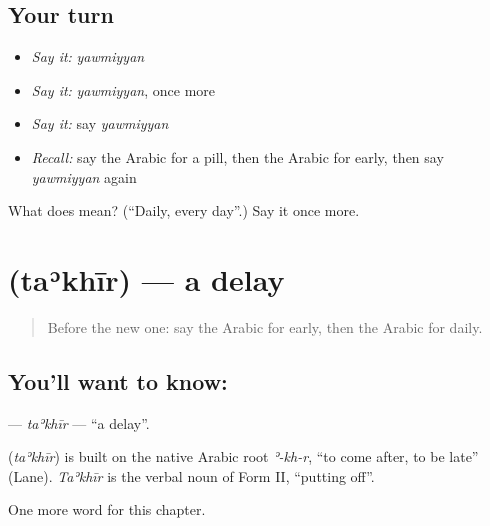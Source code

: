 \subsection*{Your turn}
\begin{itemize}
\raggedright
  \item \emph{Say it:} \emph{yawmiyyan}
  \item \emph{Say it:} \emph{yawmiyyan}, once more
  \item \emph{Say it:} say \emph{yawmiyyan}
  \item \emph{Recall:} say the Arabic for a pill, then the Arabic for early, then say \emph{yawmiyyan} again
\end{itemize}

\begin{tcolorbox}[breakable,colback=teal!4,colframe=teal!35!black,title={Before you move on}]
What does  mean? (\textquotedblleft{}Daily, every day\textquotedblright{}.) Say it once more.
\end{tcolorbox}
\section[\texorpdfstring{\ar{تأخير} (taʾkhīr)}{تأخير (taʾkhīr)}]{ (taʾkhīr) — a delay}

\label{lesson:AR-C170-takhir}



\begin{quote}
Before the new one: say the Arabic for early, then the Arabic for daily.
\end{quote}

\subsection*{You'll want to know: }
\textbf{} — \emph{taʾkhīr} — \textquotedblleft{}a delay\textquotedblright{}.

\begin{cousinweb}
\textbf{} (\emph{taʾkhīr}) is built on the native Arabic root \emph{ʾ-kh-r}, \textquotedblleft{}to come after, to be late\textquotedblright{} (Lane). \emph{Taʾkhīr} is the verbal noun of Form II, \textquotedblleft{}putting off\textquotedblright{}.
\end{cousinweb}

\begin{grammarlens}[title={What you've built}]
One more word for this chapter.
\end{grammarlens}

